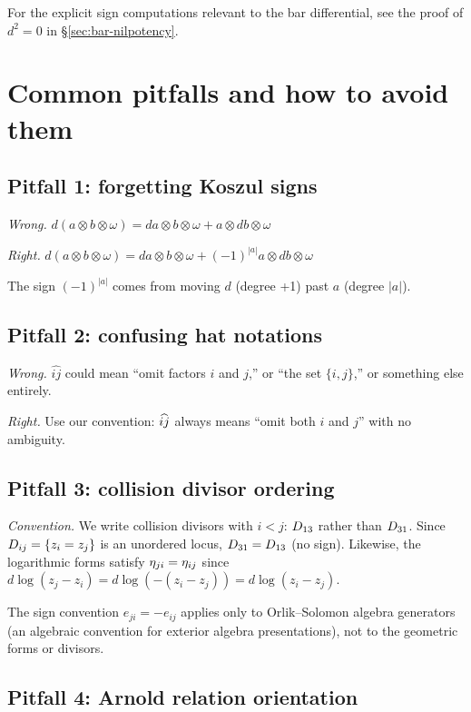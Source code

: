For the explicit sign computations relevant to the bar differential, see the proof of $d^2 = 0$ in \S\ref{sec:bar-nilpotency}.

\section{Common pitfalls and how to avoid them}

\subsection{Pitfall 1: forgetting Koszul signs}

\emph{Wrong.} $d(a \otimes b \otimes \omega) = da \otimes b \otimes \omega + a \otimes db \otimes \omega$

\emph{Right.} $d(a \otimes b \otimes \omega) = da \otimes b \otimes \omega + (-1)^{|a|} a \otimes db \otimes \omega$

The sign $(-1)^{|a|}$ comes from moving $d$ (degree +1) past $a$ (degree $|a|$).

\subsection{Pitfall 2: confusing hat notations}

\emph{Wrong.} $\widehat{ij}$ could mean ``omit factors $i$ and $j$,'' or ``the set $\{i, j\}$,'' or something else entirely.

\emph{Right.} Use our convention: $\widehat{ij}$ always means ``omit both $i$ and $j$'' with no ambiguity.

\subsection{Pitfall 3: collision divisor ordering}

\emph{Convention.} We write collision divisors with $i < j$: $D_{13}$ rather than $D_{31}$.  Since $D_{ij} = \{z_i = z_j\}$ is an unordered locus, $D_{31} = D_{13}$ (no sign).  Likewise, the logarithmic forms satisfy $\eta_{ji} = \eta_{ij}$ since $d\log(z_j - z_i) = d\log(-(z_i - z_j)) = d\log(z_i - z_j)$.

The sign convention $e_{ji} = -e_{ij}$ applies only to Orlik--Solomon algebra generators (an algebraic convention for exterior algebra presentations), not to the geometric forms or divisors.

\subsection{Pitfall 4: Arnold relation orientation}

